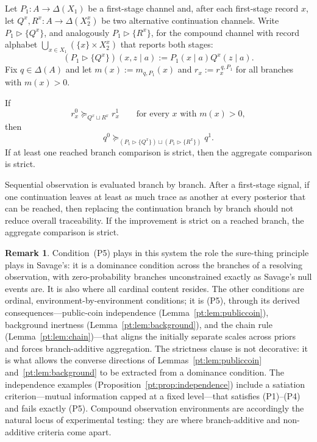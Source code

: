 \documentclass[11pt,a4paper]{article}
\theoremstyle{definition}
\newtheorem{remark}[theorem]{Remark}
\newcommand{\1}{\mathbf 1}
\begin{document}
\begin{description}[leftmargin=*,style=sameline]

\item[(P5) Branchwise continuation monotonicity.]
Let $P_1:A\to\Delta(X_1)$ be a first-stage channel and, after each first-stage record $x$, let
$Q^x,R^x:A\to\Delta(X_2^x)$ be two alternative continuation channels.  Write
$P_1\triangleright\{Q^x\}$, and analogously $P_1\triangleright\{R^x\}$, for the compound channel with record alphabet
$\bigcup_{x\in X_1}(\{x\}\times X_2^x)$ that reports both stages:
\[
(P_1\triangleright\{Q^x\})(x,z\mid a):=P_1(x\mid a)Q^x(z\mid a).
\]
Fix $q\in\Delta(A)$ and let
$m(x):=m_{q,P_1}(x)$ and $r_x:=r_x^{\,q,P_1}$ for all branches with $m(x)>0$.

If
\[
r_x^0\succeq_{Q^x\sqcup R^x}r_x^1
\qquad\text{for every }x\text{ with }m(x)>0,
\]
then
\[
q^0
\succeq_{(P_1\triangleright\{Q^x\})\sqcup(P_1\triangleright\{R^x\})}
q^1.
\]
If at least one reached branch comparison is strict, then the aggregate comparison is strict.

Sequential observation is evaluated branch by branch.  After a first-stage signal, if one continuation leaves at least as
much trace as another at every posterior that can be reached, then replacing the continuation branch by branch should not
reduce overall traceability.  If the improvement is strict on a reached branch, the aggregate comparison is strict.

\end{description}

\begin{remark}\label{pt:rem:A5role}
Condition~\textup{(P5)} plays in this system the role the sure-thing principle plays in Savage's: it is a dominance
condition across the branches of a resolving observation, with zero-probability branches unconstrained exactly as
Savage's null events are.  It is also where all cardinal content resides.  The other conditions are ordinal,
environment-by-environment conditions; it is \textup{(P5)}, through its derived consequences---public-coin
independence (Lemma~\ref{pt:lem:publiccoin}), background inertness (Lemma~\ref{pt:lem:background}), and the chain rule
(Lemma~\ref{pt:lem:chain})---that aligns the initially separate scales across priors and forces branch-additive
aggregation.  The strictness clause is not decorative: it is what allows the converse directions of
Lemmas~\ref{pt:lem:publiccoin} and~\ref{pt:lem:background} to be extracted from a dominance condition.
The independence examples (Proposition~\ref{pt:prop:independence}) include a satiation criterion---mutual
information capped at a fixed level---that satisfies \textup{(P1)}--\textup{(P4)} and fails exactly \textup{(P5)}.  Compound observation environments are
accordingly the natural locus of experimental testing: they are where branch-additive and non-additive criteria come
apart.
\end{remark}
\end{document}
